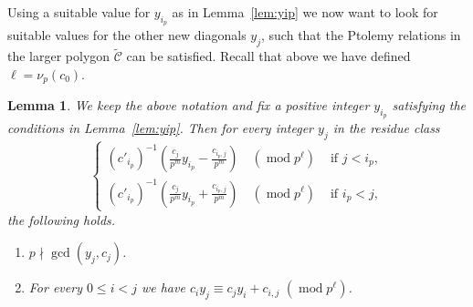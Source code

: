 \documentclass[10pt]{amsart}
\numberwithin{equation}{section}
\newtheorem{lemm}[theo]{Lemma}
\theoremstyle{definition}
\theoremstyle{remark}
\DeclareMathOperator{\md}{mod}
\begin{document}
Using a suitable value for $y_{i_p}$ as in Lemma~\ref{lem:yip} we now want to
look for suitable values for the other new diagonals $y_j$, such that 
the Ptolemy relations in the larger polygon $\widetilde{\mathcal{C}}$ can 
be satisfied. Recall that above we have defined 
$\ell=\nu_p(c_0)$.


\begin{lemm} \label{lem:yj}
We keep the above notation and fix a positive integer $y_{i_p}$ satisfying the conditions
in Lemma~\ref{lem:yip}. 
Then for every integer $y_j$ in the residue class 
\[
\begin{cases}
(c'_{i_p})^{-1} \left( \frac{c_j}{p^m} y_{i_p} - \frac{c_{i_p,j}}{p^m}\right)\quad
(\md p^{\ell}) & \text{ if } j<i_p ,\\[4pt]
(c'_{i_p})^{-1} \left( \frac{c_j}{p^m} y_{i_p} + \frac{c_{i_p,j}}{p^m}\right) \quad
(\md p^{\ell})
& \text{ if } i_p<j,
\end{cases} 
\]
the following holds.
\begin{enumerate}[label=(\alph*)]
\item\label{lemma4.4_a} %
$p\nmid \gcd(y_j,c_j)$.
\item\label{lemma4.4_b} %
For every $0\le i<j$ we have
$c_i y_j \equiv c_j y_i + c_{i,j}\,\,(\md p^{\ell})$.
\end{enumerate}
\end{lemm}
\end{document}

